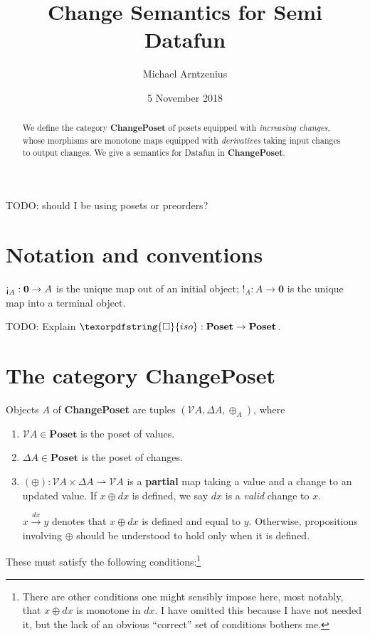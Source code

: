 \documentclass[nomarginums]{rntz}
\title{Change Semantics for Semi\naive{} Datafun}
\author{Michael Arntzenius}
\date{5 November 2018}
\newcommand\todo[1]{{\color{Rhodamine}#1}}
\newcommand\cat\textbf
\newcommand\strong\textbf
\newcommand\CP{\cat{ChangePoset}}
\newcommand\Poset{\cat{Poset}}
\newcommand\initO{\ensuremath{\mathbold{0}}}
\newcommand\initE{\mathop{\text{\textexclamdown}}}
\newcommand\termI{\mathop{!}}
\newcommand\D\Delta
\newcommand\x\times
\newcommand\iso{\texorpdfstring{\ensuremath{\square}}{iso}}
\newcommand\validarrow{{\to}}
\newcommand\valid[1]{\mathrel{\overset{#1}{\validarrow}}}
\newcommand\vals[1]{#1^v} %
\newcommand\chgs[1]{\D{#1}}
\renewcommand\vals{\mathcal{V}}
\begin{document}
\maketitle

\begin{abstract}
  We define the category \CP{} of posets equipped with \emph{increasing
    changes}, whose morphisms are monotone maps equipped with \emph{derivatives}
  taking input changes to output changes. We give a semantics for Datafun in
  \CP.
\end{abstract}

\todo{TODO: should I be using posets or preorders?}


\section{Notation and conventions}

$\initE_A : \initO \to A$ is the unique map out of an initial object; $\termI_A
: A \to \initO$ is the unique map into a terminal object.

\todo{TODO: Explain $\iso : \Poset \to \Poset$.}


\section{The category \CP}

\newcommand\pto\rightharpoonup
\newcommand\upd\oplus

Objects $A$ of \CP{} are tuples $(\vals A, \chgs A, \upd_A)$, where
\begin{enumerate}
\item $\vals A \in \Poset$ is the poset of values.
\item $\chgs A \in \Poset$ is the poset of changes.
\item $(\upd) : \vals A \x \chgs A \pto \vals A$ is a \strong{partial} map
  taking a value and a change to an updated value. If $x \upd dx$ is defined, we
  say $dx$ is a \emph{valid} change to $x$.

  $x \valid{dx} y$ denotes that $x \upd dx$ is defined and equal to $y$.
  Otherwise, propositions involving $\upd$ should be understood to hold only
  when it is defined.
\end{enumerate}

\noindent
These must satisfy the following conditions:\footnote{There are other
  conditions one might sensibly impose here, most notably, that $x \upd dx$ is
  monotone in $dx$. I have omitted this because I have not needed it, but the
  lack of an obvious ``correct'' set of conditions bothers me.}
\end{document}

